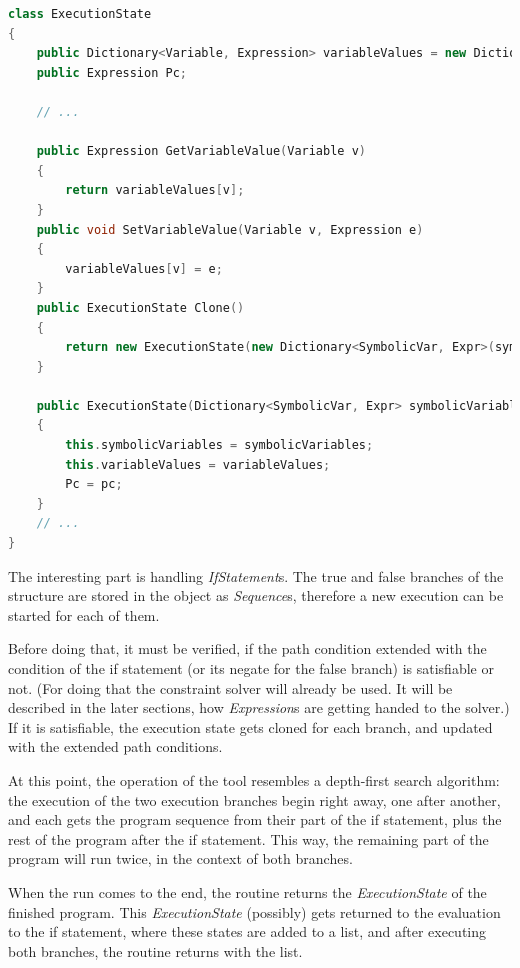 \begin{lstlisting}[frame=single,escapechar=@,float=!ht,caption={The part of ExecutionState related to execution},captionpos=b,label={lst:executionstate},language=C++]
class ExecutionState
{
    public Dictionary<Variable, Expression> variableValues = new Dictionary<Variable, Expression>();
    public Expression Pc;

    // ...

    public Expression GetVariableValue(Variable v)
    {
        return variableValues[v];
    }
    public void SetVariableValue(Variable v, Expression e)
    {
        variableValues[v] = e;
    }
    public ExecutionState Clone()
    {
        return new ExecutionState(new Dictionary<SymbolicVar, Expr>(symbolicVariables), new Dictionary<Variable, Expression>(variableValues), Pc);
    }

    public ExecutionState(Dictionary<SymbolicVar, Expr> symbolicVariables, Dictionary<Variable, Expression> variableValues, Expression pc)
    {
        this.symbolicVariables = symbolicVariables;
        this.variableValues = variableValues;
        Pc = pc;
    }
    // ...
}

\end{lstlisting}

The interesting part is handling \textit{IfStatement}s. The true and false branches of the structure are stored in the object as \textit{Sequence}s, therefore a new execution can be started for each of them. 

Before doing that, it must be verified, if the path condition extended with the condition of the if statement (or its negate for the false branch) is satisfiable or not. (For doing that the constraint solver will already be used. It will be described in the later sections, how \textit{Expression}s are getting handed to the solver.) If it is satisfiable, the execution state gets cloned for each branch, and updated with the extended path conditions. 

At this point, the operation of the tool resembles a depth-first search algorithm: the execution of the two execution branches begin right away, one after another, and each gets the program sequence from their part of the if statement, plus the rest of the program after the if statement. This way, the remaining part of the program will run twice, in the context of both branches.

When the run comes to the end, the routine returns the \textit{ExecutionState} of the finished program. This \textit{ExecutionState} (possibly) gets returned to the evaluation to the if statement, where these states are added to a list, and after executing both branches, the routine returns with the list. 

